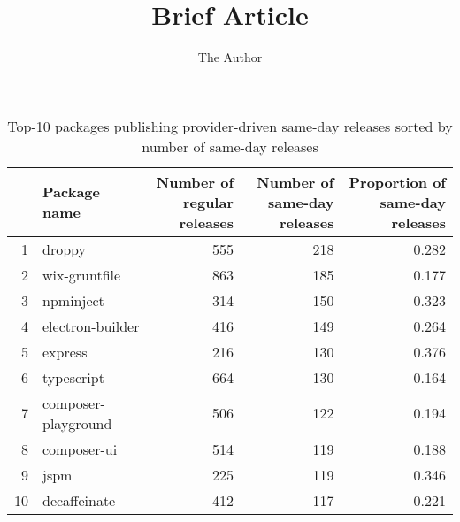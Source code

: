 \documentclass[11pt, oneside]{article}   	%
\title{Brief Article}
\author{The Author}
\begin{document}
\maketitle

\begin{table}[ht]
\centering
\begin{tabular}{rlrrr}
  \hline
 & \pbox{20cm}{Package \\name} & \pbox{20cm}{Number of \\regular releases} & \pbox{20cm}{Number of \\same-day releases} & \pbox{20cm}{Proportion of \\same-day releases} \\ 
  \hline
1 & droppy & 555 & 218 & 0.282 \\ 
  2 & wix-gruntfile & 863 & 185 & 0.177 \\ 
  3 & npminject & 314 & 150 & 0.323 \\ 
  4 & electron-builder & 416 & 149 & 0.264 \\ 
  5 & express & 216 & 130 & 0.376 \\ 
  6 & typescript & 664 & 130 & 0.164 \\ 
  7 & composer-playground & 506 & 122 & 0.194 \\ 
  8 & composer-ui & 514 & 119 & 0.188 \\ 
  9 & jspm & 225 & 119 & 0.346 \\ 
  10 & decaffeinate & 412 & 117 & 0.221 \\ 
   \hline
\end{tabular}
\caption{Top-10 packages publishing provider-driven same-day releases sorted by number of same-day releases} 
\end{table}
\end{document}
